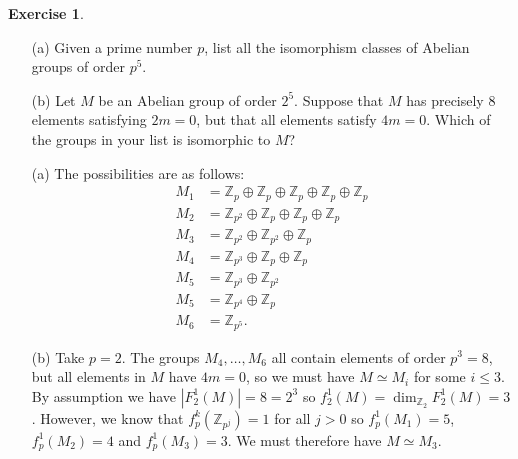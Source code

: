 \documentclass{amsart}
\newcommand{\Z}         {{\mathbb{Z}}}
\newcommand{\ip}[1]     {\langle #1\rangle}
\newcommand{\op}        {\oplus}
\renewcommand{\:}{\colon}
\theoremstyle{definition}
\newtheorem{exercise}{Exercise}[section]
\renewenvironment{solution}{\SolutionAtEnd}{\endSolutionAtEnd}
\begin{document}
\begin{exercise}
 \begin{itemize}
  \item[(a)] Given a prime number $p$, list all the isomorphism classes
   of Abelian groups of order $p^5$.
  \item[(b)] Let $M$ be an Abelian group of order $2^5$.  Suppose that
   $M$ has precisely $8$ elements satisfying $2m=0$, but that all
   elements satisfy $4m=0$.  Which of the groups in your list is
   isomorphic to $M$?
 \end{itemize}
\end{exercise}
\begin{solution}
 \begin{itemize}
  \item[(a)]
   The possibilities are as follows:
   \begin{align*}
    M_1 &= \Z_p\op\Z_p\op\Z_p\op\Z_p\op\Z_p \\
    M_2 &= \Z_{p^2}\op\Z_p\op\Z_p\op\Z_p \\
    M_3 &= \Z_{p^2}\op\Z_{p^2}\op\Z_p \\
    M_4 &= \Z_{p^3}\op\Z_p\op\Z_p \\
    M_5 &= \Z_{p^3}\op\Z_{p^2} \\
    M_5 &= \Z_{p^4}\op\Z_p \\
    M_6 &= \Z_{p^5}.
   \end{align*}
  \item[(b)] Take $p=2$.  The groups $M_4,\ldots,M_6$ all contain
   elements of order $p^3=8$, but all elements in $M$ have $4m=0$, so
   we must have $M\simeq M_i$ for some $i\leq 3$.  By assumption we
   have $|F_2^1(M)|=8=2^3$ so $f_2^1(M)=\dim_{\Z_2}F_2^1(M)=3$.
   However, we know that $f_p^k(\Z_{p^j})=1$ for all $j>0$ so
   $f_p^1(M_1)=5$, $f_p^1(M_2)=4$ and $f_p^1(M_3)=3$.  We must
   therefore have $M\simeq M_3$.
 \end{itemize} 
\end{solution}
\end{document}
